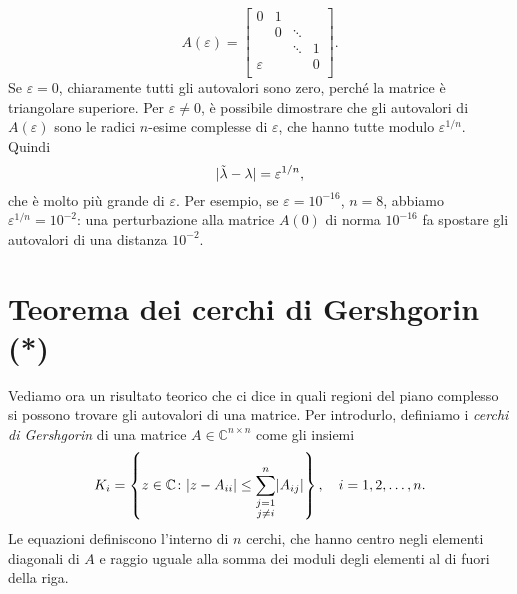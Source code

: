 \documentclass[a4paper]{report}
\DeclarePairedDelimiter{\abs}{\lvert}{\rvert}
\theoremstyle{definiton}
\theoremstyle{remark}
\begin{document}
\[
A(\varepsilon) = \begin{bmatrix}
    0 & 1\\
    & 0 & \ddots\\
    & & \ddots & 1\\
    \varepsilon & & &  0\\
\end{bmatrix}.
\]
Se $\varepsilon=0$, chiaramente tutti gli autovalori sono zero, perché la matrice è triangolare superiore. Per $\varepsilon \neq 0$, è possibile dimostrare che gli autovalori di $A(\varepsilon)$ sono le radici $n$-esime complesse di $\varepsilon$, che hanno tutte modulo $\varepsilon^{1/n}$. Quindi
\[
\abs{\tilde{\lambda} - \lambda} = \varepsilon^{1/n},
\]
che è molto più grande di $\varepsilon$. Per esempio, se $\varepsilon=10^{-16}$, $n=8$, abbiamo $\varepsilon^{1/n} = 10^{-2}$: una perturbazione alla matrice $A(0)$ di norma $10^{-16}$ fa spostare gli autovalori di una distanza $10^{-2}$.

\section{Teorema dei cerchi di Gershgorin (*)}

Vediamo ora un risultato teorico che ci dice in quali regioni del piano complesso si possono trovare gli autovalori di una matrice. Per introdurlo, definiamo i \emph{cerchi di Gershgorin} di una matrice $A\in\mathbb{C}^{n\times n}$ come gli insiemi
\[
K_i = \left\{z\in \mathbb{C} \colon \abs{z - A_{ii}} \leq \sum_{\substack{j=1\\ j \neq i}}^n \abs{A_{ij}} \right\}, \quad i=1,2,\dots,n.
\]
Le equazioni definiscono l'interno di $n$ cerchi, che hanno centro negli elementi diagonali di $A$ e raggio uguale alla somma dei moduli degli elementi al di fuori della riga.
\end{document}
